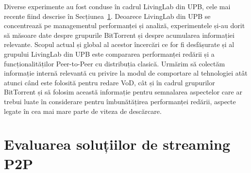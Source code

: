 Diverse experimente au fost conduse în cadrul LivingLab din UPB, cele mai
recente fiind descrise în Secțiunea~\ref{sec:multimedia-dist:evaluation}.
Deoarece LivingLab din UPB se concentrează pe managementul performanței și
analiză, experimentele și-au dorit să măsoare date despre grupurile
BitTorrent și despre acumularea informației relevante.
Scopul actual și global al acestor încercări ce for fi desfășurate și al
grupului LivingLab din UPB este compararea performanței redării și a
funcționalităților Peer-to-Peer cu distribuția clasică. Urmărim să colectăm
informație internă relevantă cu privire la modul de comportare al tehnologiei
atât atunci când este folosită pentru redare VoD, cât și în cadrul grupurilor
BitTorrent și să folosim această informație pentru semnalarea aspectelor
care ar trebui luate în considerare pentru îmbunătățirea performanței redării,
aspecte legate în cea mai mare parte de viteza de descărcare.


\section{Evaluarea soluțiilor de streaming P2P}
\label{sec:multimedia-dist:evaluation}

